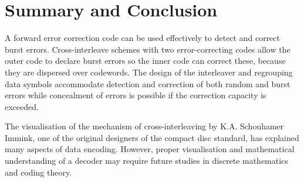 \documentclass[../main.tex]{subfiles}
\begin{document}
    \chapter{Summary and Conclusion}
    A forward error correction code can be used effectively to detect and correct burst errors. Cross-interleave schemes with two error-correcting codes allow the outer code to declare burst errors so the inner code can correct these, because they are dispersed over codewords. The design of the interleaver and regrouping data symbols accommodate detection and correction of both random and burst errors while concealment of errors is possible if the correction capacity is exceeded.

    The visualisation of the mechanism of cross-interleaving by K.A. Schouhamer Immink, one of the original designers of the compact disc standard, has explained many aspects of data encoding. However, proper visualisation and mathematical understanding of a decoder may require future studies in discrete mathematics and coding theory.
\end{document}
